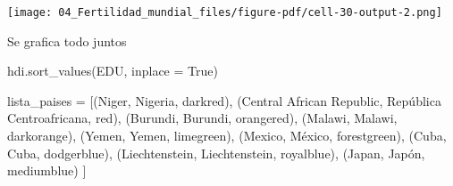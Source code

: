 \documentclass[
  letterpaper,
  DIV=11,
  numbers=noendperiod]{scrreprt}
\newenvironment{Shaded}{\begin{snugshade}}{\end{snugshade}}
\newcommand{\NormalTok}[1]{\textcolor[rgb]{0.00,0.23,0.31}{#1}}
\newcommand{\OperatorTok}[1]{\textcolor[rgb]{0.37,0.37,0.37}{#1}}
\newcommand{\StringTok}[1]{\textcolor[rgb]{0.13,0.47,0.30}{#1}}
\newcommand{\VariableTok}[1]{\textcolor[rgb]{0.07,0.07,0.07}{#1}}
\begin{document}
\texttt{[image: 04\_Fertilidad\_mundial\_files/figure-pdf/cell-30-output-2.png]}

Se grafica todo juntos

\begin{Shaded}
\begin{Highlighting}[]
\NormalTok{hdi.sort\_values(}\StringTok{\textquotesingle{}EDU\textquotesingle{}}\NormalTok{, inplace }\OperatorTok{=} \VariableTok{True}\NormalTok{)}

\NormalTok{lista\_paises }\OperatorTok{=}\NormalTok{ [(}\StringTok{\textquotesingle{}Niger\textquotesingle{}}\NormalTok{, }\StringTok{\textquotesingle{}Nigeria\textquotesingle{}}\NormalTok{, }\StringTok{\textquotesingle{}darkred\textquotesingle{}}\NormalTok{), }
\NormalTok{             (}\StringTok{\textquotesingle{}Central African Republic\textquotesingle{}}\NormalTok{, }\StringTok{\textquotesingle{}República Centroafricana\textquotesingle{}}\NormalTok{, }\StringTok{\textquotesingle{}red\textquotesingle{}}\NormalTok{),}
\NormalTok{             (}\StringTok{\textquotesingle{}Burundi\textquotesingle{}}\NormalTok{, }\StringTok{\textquotesingle{}Burundi\textquotesingle{}}\NormalTok{, }\StringTok{\textquotesingle{}orangered\textquotesingle{}}\NormalTok{),}
\NormalTok{             (}\StringTok{\textquotesingle{}Malawi\textquotesingle{}}\NormalTok{, }\StringTok{\textquotesingle{}Malawi\textquotesingle{}}\NormalTok{, }\StringTok{\textquotesingle{}darkorange\textquotesingle{}}\NormalTok{),}
\NormalTok{             (}\StringTok{\textquotesingle{}Yemen\textquotesingle{}}\NormalTok{, }\StringTok{\textquotesingle{}Yemen\textquotesingle{}}\NormalTok{, }\StringTok{\textquotesingle{}limegreen\textquotesingle{}}\NormalTok{), }
\NormalTok{             (}\StringTok{\textquotesingle{}Mexico\textquotesingle{}}\NormalTok{, }\StringTok{\textquotesingle{}México\textquotesingle{}}\NormalTok{, }\StringTok{\textquotesingle{}forestgreen\textquotesingle{}}\NormalTok{),}
\NormalTok{             (}\StringTok{\textquotesingle{}Cuba\textquotesingle{}}\NormalTok{, }\StringTok{\textquotesingle{}Cuba\textquotesingle{}}\NormalTok{, }\StringTok{\textquotesingle{}dodgerblue\textquotesingle{}}\NormalTok{),}
\NormalTok{             (}\StringTok{\textquotesingle{}Liechtenstein\textquotesingle{}}\NormalTok{, }\StringTok{\textquotesingle{}Liechtenstein\textquotesingle{}}\NormalTok{, }\StringTok{\textquotesingle{}royalblue\textquotesingle{}}\NormalTok{),}
\NormalTok{             (}\StringTok{\textquotesingle{}Japan\textquotesingle{}}\NormalTok{, }\StringTok{\textquotesingle{}Japón\textquotesingle{}}\NormalTok{, }\StringTok{\textquotesingle{}mediumblue\textquotesingle{}}\NormalTok{)}
\NormalTok{               ]}


\end{Highlighting}
\end{Shaded}
\end{document}
